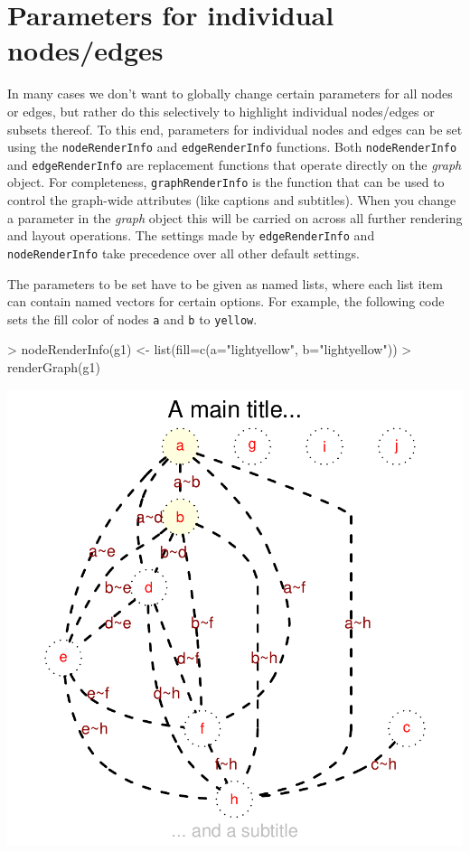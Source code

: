 \documentclass{article}
\newcommand{\Rfunction}[1]{{\texttt{#1}}}
\newcommand{\Robject}[1]{{\texttt{#1}}}
\newcommand{\Rclass}[1]{{\textit{#1}}}
\begin{document}
\section{Parameters for individual nodes/edges} 
In many cases we don't want to globally change certain parameters for
all nodes or edges, but rather do this selectively to highlight
individual nodes/edges or subsets thereof. To this end, parameters for
individual nodes and edges can be set using the
\Rfunction{nodeRenderInfo} and \Rfunction{edgeRenderInfo}
functions. Both \Rfunction{nodeRenderInfo} and
\Rfunction{edgeRenderInfo} are replacement functions that operate
directly on the \Rclass{graph} object. For completeness,
\Rfunction{graphRenderInfo} is the function that can be used to
control the graph-wide attributes (like captions and subtitles). When
you change a parameter in the \Rclass{graph} object this will be
carried on across all further rendering and layout operations. The
settings made by \Rfunction{edgeRenderInfo} and
\Rfunction{nodeRenderInfo} take precedence over all other default
settings.

The parameters to be set have to be given as named lists, where each
list item can contain named vectors for certain options. For example,
the following code sets the fill color of nodes \Robject{a} and
\Robject{b} to \Robject{yellow}.
\begin{Schunk}
\begin{Sinput}
> nodeRenderInfo(g1) <- list(fill=c(a="lightyellow", b="lightyellow"))
> renderGraph(g1) 
\end{Sinput}
\end{Schunk}
\includegraphics{newRgraphvizInterface-nodePars}
\end{document}
